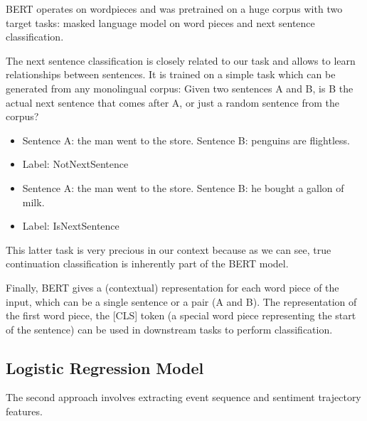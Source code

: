\documentclass{article}
\begin{document}
BERT operates on wordpieces and was pretrained on a huge corpus with two target tasks: masked language model on word pieces and next sentence classification.


The next sentence classification is closely related to our task and allows to learn relationships between sentences. It is trained on a simple task which can be generated from any monolingual corpus: Given two sentences A and B, is B the actual next sentence that comes after A, or just a random sentence from the corpus? 
\begin{itemize}
    \item Sentence A: the man went to the store.  Sentence B: penguins are flightless.
    \item Label: NotNextSentence
\end{itemize}

\begin{itemize}
    \item Sentence A: the man went to the store. Sentence B: he bought a gallon of milk.
    \item Label: IsNextSentence
\end{itemize}

This latter task is very precious in our context because as we can see, true continuation classification is inherently part of the BERT model.

Finally, BERT gives a (contextual) representation for each word piece of the input, which can be a single sentence or a pair (A and B). The representation of the first word piece, the [CLS] token (a special word piece representing the start of the sentence) can be used in downstream tasks to perform classification.

\subsection{Logistic Regression Model}
The second approach involves extracting event sequence and sentiment trajectory features. 
\end{document}
